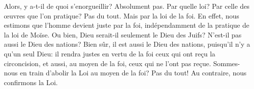 Alors, y a-t-il de quoi s’enorgueillir?
	Absolument pas.
Par quelle loi? Par celle des œuvres que l’on pratique?
	Pas du tout.
	Mais par la loi de la foi.
En effet, nous estimons que l’homme devient juste par la foi,
	indépendamment de la pratique de la loi de Moïse.
Ou bien, Dieu serait-il seulement le Dieu des Juifs?
N’est-il pas aussi le Dieu des nations?
Bien sûr, il est aussi le Dieu des nations,
	puisqu’il n’y a qu’un seul Dieu:
	il rendra justes en vertu de la foi ceux qui ont reçu la circoncision,
	et aussi, au moyen de la foi, ceux qui ne l’ont pas reçue.
Sommes-nous en train d’abolir la Loi au moyen de la foi?
	Pas du tout! Au contraire, nous confirmons la Loi.
